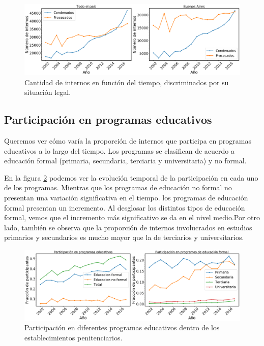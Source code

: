 \documentclass[10pt]{article}
\begin{document}
\begin{figure}[H]
	\centering
	\includegraphics[scale=0.26]{graficos/situacion_legal.png}
	\caption{Cantidad de internos en funci\'on del tiempo, discriminados por su situaci\'on legal. \label{fig:situacion_legal}}
\end{figure}


\subsection{Participación en programas educativos}

Queremos ver cómo varía la proporción de internos que participa en programas educativos a lo largo del tiempo. Los programas se clasifican de acuerdo a educaci\'on formal (primaria, secundaria, terciaria y universitaria) y no formal.

En la figura \ref{fig:educativos} podemos ver la evoluci\'on temporal de la participaci\'on en cada uno de los programas. Mientras que los programas de educaci\'on no formal no presentan una variaci\'on significativa en el tiempo. los programas de educaci\'on formal presentan un incremento. Al desglosar los distintos tipos de educaci\'on formal, vemos que el incremento m\'as significativo se da en el nivel medio.Por otro lado, también se observa que la proporción de internos involucrados en estudios primarios y secundarios es mucho mayor que la de terciarios y universitarios.

\begin{figure}[H]
	\centering
	\includegraphics[scale=0.26]{graficos/participacion_educativos.png}
	\caption{Participaci\'on en diferentes programas educativos dentro de los establecimientos penitenciarios.\label{fig:educativos}}
\end{figure}
\end{document}
